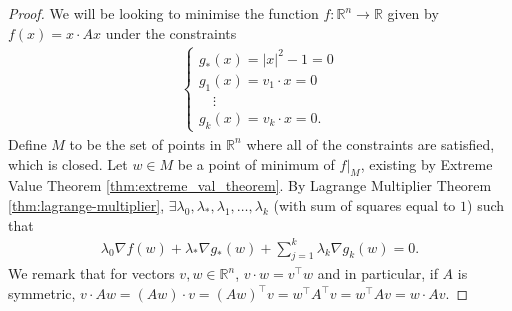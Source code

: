 \begin{proof}
	We will be looking to minimise the function $f: \mathbb{R}^{n} \to \mathbb{R}$ given by $f(x) = x \cdot A x$ under the constraints
	\begin{align*}
		\begin{cases}
			g_{*}(x) = \left| x \right|^{2} - 1 = 0 \\
			g_{1}(x) = v_{1} \cdot  x = 0           \\
			\quad \vdots                            \\
			g_{k}(x) = v_{k} \cdot  x = 0.
		\end{cases}
	\end{align*}
	Define $M$ to be the set of points in $\mathbb{R}^{n}$ where all of the constraints are satisfied, which is closed. Let $w \in M$ be a point of minimum of $f|_{M}$, existing by Extreme Value Theorem \ref{thm:extreme_val_theorem}. By Lagrange Multiplier Theorem \ref{thm:lagrange-multiplier}, $\exists \lambda_{0}, \lambda_{*}, \lambda_{1}, \dots, \lambda_{k}$ (with sum of squares equal to $1$) such that
	\begin{align*}
		\lambda_{0} \nabla f(w) + \lambda_{*}\nabla g_{*}(w) + \sum_{j=1}^{k} \lambda_{k} \nabla g_{k}(w)=0.
	\end{align*}
	We remark that for vectors $v,w \in \mathbb{R}^{n}$, $v \cdot w = v^\top w$ and in particular, if $A$ is symmetric, $v\cdot Aw = (Aw) \cdot v = (Aw)^\top v = w^\top A^\top v = w^\top A v = w \cdot Av$.


\end{proof}
